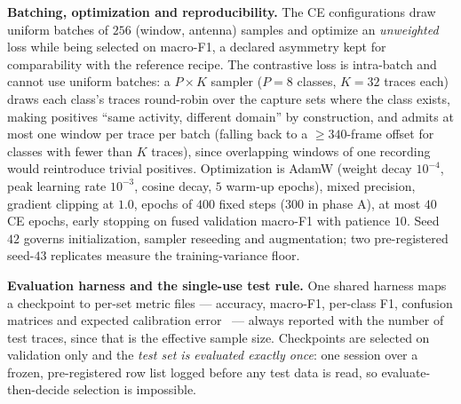 \textbf{Batching, optimization and reproducibility.} The CE configurations
draw uniform batches of $256$ (window, antenna) samples and optimize an
\emph{unweighted} loss while being selected on macro-F1, a declared asymmetry
kept for comparability with the reference recipe. The contrastive loss is
intra-batch and cannot use uniform batches: a $P{\times}K$ sampler ($P=8$
classes, $K=32$ traces each) draws each class's traces round-robin over the
capture sets where the class exists, making positives ``same activity,
different domain'' by construction, and admits at most one window per trace
per batch (falling back to a $\geq340$-frame offset for classes with fewer
than $K$ traces), since overlapping windows of one recording would reintroduce
trivial positives. Optimization is AdamW
(weight decay $10^{-4}$, peak learning rate $10^{-3}$, cosine decay, $5$
warm-up epochs), mixed precision, gradient clipping at $1.0$, epochs of $400$
fixed steps ($300$ in phase A), at most $40$ CE epochs, early stopping on fused
validation macro-F1 with patience $10$. Seed $42$ governs initialization,
sampler reseeding and augmentation; two pre-registered seed-$43$ replicates
measure the training-variance floor.

\textbf{Evaluation harness and the single-use test rule.} One shared harness
maps a checkpoint to per-set metric files --- accuracy, macro-F1, per-class
F1, confusion matrices and expected calibration error~\cite{Guo-2017} --- always reported with
the
number of test traces, since that is the effective sample size. Checkpoints
are selected on validation only and the \emph{test set is evaluated exactly
once}: one session over a frozen, pre-registered row list logged before any
test data is read, so evaluate-then-decide selection is impossible.
